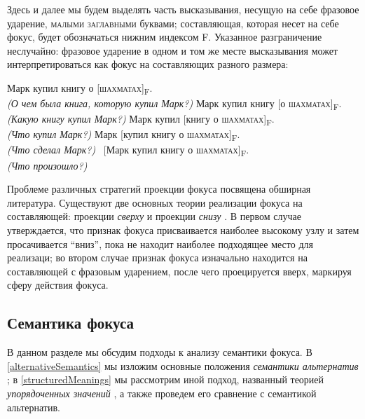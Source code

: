 \documentclass[a4paper, titlepage, 12pt]{article}
\begin{document}
\medskip

Здесь и далее мы будем выделять часть высказывания, несущую на себе фразовое ударение, \textsc{малыми заглавными} буквами; составляющая, которая несет на себе фокус, будет обозначаться нижним индексом F. Указанное разграничение неслучайно: фразовое ударение в одном и том же месте высказывания может интерпретироваться как фокус на составляющих разного размера:

\begin{exe}
    \ex \begin{xlist} \label{pitchAccentVSfocus}
        \ex Марк купил книгу о [\textsc{шахматах}]\textsubscript{F}. \\ \textit{(О чем была книга, которую купил Марк?)}
        \ex Марк купил книгу [о \textsc{шахматах}]\textsubscript{F}. \\ \textit{(Какую книгу купил Марк?)}
        \ex Марк купил [книгу о \textsc{шахматах}]\textsubscript{F}. \\ \textit{(Что купил Марк?)}
        \ex Марк [купил книгу о \textsc{шахматах}]\textsubscript{F}. \\ \textit{(Что сделал Марк?)}
        \ex ~[Марк купил книгу о \textsc{шахматах}]\textsubscript{F}. \\ \textit{(Что произошло?)}
    \end{xlist}
\end{exe}

\medskip

Проблеме различных стратегий проекции фокуса посвящена обширная литература. Существуют две основных теории реализации фокуса на составляющей: проекции \textit{сверху} и проекции \textit{снизу} \citep{winkler1997focus}. В первом случае \citep{gussenhoven1983focus} утверждается, что признак фокуса присваивается наиболее высокому узлу и затем просачивается ``вниз'', пока не находит наиболее подходящее место для реализаци; во втором случае \citep{selkirk1984phonology, selkirk1996prosodic} признак фокуса изначально находится на составляющей с фразовым ударением, после чего проецируется вверх, маркируя сферу действия фокуса.

\subsection{Семантика фокуса}

В данном разделе мы обсудим подходы к анализу семантики фокуса. В \ref{alternativeSemantics} мы изложим основные положения \textit{семантики альтернатив} \citep{rooth1985association,rooth1992theory}; в \ref{structuredMeanings} мы рассмотрим иной подход, названный теорией \textit{упорядоченных значений} \citep{Cresswell1985}, а также проведем его сравнение с семантикой альтернатив.
\end{document}
